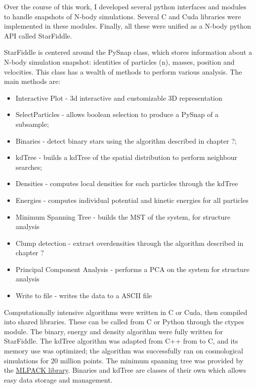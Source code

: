 Over the course of this work, I developed several python interfaces and modules to handle snapshots of N-body simulations. Several C and Cuda libraries were implemented in these modules. Finally, all these were unified as a N-body python API called StarFiddle.

StarFiddle is centered around the PySnap class, which stores information about a N-body simulation snapshot: identities of particles (n), masses, position and velocities. This class has a wealth of methods to perform various analysis. The main methods are:

\begin{itemize}
\item Interactive Plot - 3d interactive and customizable 3D representation
\item SelectParticles - allows boolean selection to produce a PySnap of a subsample;
\item Binaries - detect binary stars using the algorithm described in chapter ?;
\item kdTree - builds a kdTree of the spatial distribution to perform neighbour searches;
\item Densities - computes local densities for each particles through the kdTree
\item Energies - computes individual potential and kinetic energies for all particles
\item Minimum Spanning Tree - builds the MST of the system, for structure analysis
\item Clump detection - extract overdensities through the algorithm described in chapter ?
\item Principal Component Analysis - performs a PCA on the system for structure analysis
\item Write to file - writes the data to a ASCII file
\end{itemize}

Computationally intensive algorithms were written in C or Cuda, then compiled into shared libraries. These can be called from C or Python through the ctypes module. The binary, energy and density algorithm were fully written for StarFiddle. The kdTree algorithm was adapted from C++ from \cite{numericalrecipes} to C, and its memory use was optimized; the algorithm was successfully ran on cosmological simulations for 20 million points. The minimum spanning tree was provided by the \href{http://mlpack.org/}{MLPACK library}. Binaries and kdTree are classes of their own which allows easy data storage and management.

